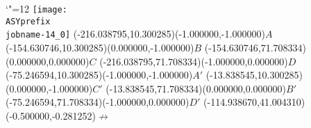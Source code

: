 \setlength{\unitlength}{1pt}%
\makeatletter%
\let\ASYencoding\f@encoding%
\let\ASYfamily\f@family%
\let\ASYseries\f@series%
\let\ASYshape\f@shape%
\makeatother%
{\catcode`"=12%
\texttt{[image: \\ASYprefix\\jobname-14\_0]}%
}%
\color{ASYcolor}%
\fontsize{12.000000}{14.400000}\selectfont%
\usefont{\ASYencoding}{\ASYfamily}{\ASYseries}{\ASYshape}%
\ASYalign(-216.038795,10.300285)(-1.000000,-1.000000){$A$}%
\color{ASYcolor}%
\fontsize{12.000000}{14.400000}\selectfont%
\ASYalign(-154.630746,10.300285)(0.000000,-1.000000){$B$}%
\color{ASYcolor}%
\fontsize{12.000000}{14.400000}\selectfont%
\ASYalign(-154.630746,71.708334)(0.000000,0.000000){$C$}%
\color{ASYcolor}%
\fontsize{12.000000}{14.400000}\selectfont%
\ASYalign(-216.038795,71.708334)(-1.000000,0.000000){$D$}%
\color{ASYcolor}%
\fontsize{12.000000}{14.400000}\selectfont%
\ASYalign(-75.246594,10.300285)(-1.000000,-1.000000){$A'$}%
\color{ASYcolor}%
\fontsize{12.000000}{14.400000}\selectfont%
\ASYalign(-13.838545,10.300285)(0.000000,-1.000000){$C'$}%
\color{ASYcolor}%
\fontsize{12.000000}{14.400000}\selectfont%
\ASYalign(-13.838545,71.708334)(0.000000,0.000000){$B'$}%
\color{ASYcolor}%
\fontsize{12.000000}{14.400000}\selectfont%
\ASYalign(-75.246594,71.708334)(-1.000000,0.000000){$D'$}%
\color{ASYcolor}%
\fontsize{12.000000}{14.400000}\selectfont%
\ASYalign(-114.938670,41.004310)(-0.500000,-0.281252){$\not\longrightarrow$}%
